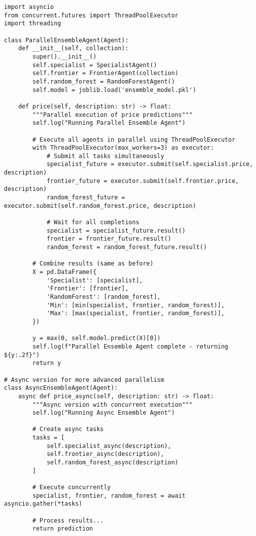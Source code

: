 \begin{lstlisting}[caption=Parallel Agent Execution (Enhanced Version)]
import asyncio
from concurrent.futures import ThreadPoolExecutor
import threading

class ParallelEnsembleAgent(Agent):
    def __init__(self, collection):
        super().__init__()
        self.specialist = SpecialistAgent()
        self.frontier = FrontierAgent(collection)
        self.random_forest = RandomForestAgent()
        self.model = joblib.load('ensemble_model.pkl')
        
    def price(self, description: str) -> float:
        """Parallel execution of price predictions"""
        self.log("Running Parallel Ensemble Agent")
        
        # Execute all agents in parallel using ThreadPoolExecutor
        with ThreadPoolExecutor(max_workers=3) as executor:
            # Submit all tasks simultaneously
            specialist_future = executor.submit(self.specialist.price, description)
            frontier_future = executor.submit(self.frontier.price, description)
            random_forest_future = executor.submit(self.random_forest.price, description)
            
            # Wait for all completions
            specialist = specialist_future.result()
            frontier = frontier_future.result()
            random_forest = random_forest_future.result()
        
        # Combine results (same as before)
        X = pd.DataFrame({
            'Specialist': [specialist],
            'Frontier': [frontier],
            'RandomForest': [random_forest],
            'Min': [min(specialist, frontier, random_forest)],
            'Max': [max(specialist, frontier, random_forest)],
        })
        
        y = max(0, self.model.predict(X)[0])
        self.log(f"Parallel Ensemble Agent complete - returning ${y:.2f}")
        return y

# Async version for more advanced parallelism
class AsyncEnsembleAgent(Agent):
    async def price_async(self, description: str) -> float:
        """Async version with concurrent execution"""
        self.log("Running Async Ensemble Agent")
        
        # Create async tasks
        tasks = [
            self.specialist_async(description),
            self.frontier_async(description), 
            self.random_forest_async(description)
        ]
        
        # Execute concurrently
        specialist, frontier, random_forest = await asyncio.gather(*tasks)
        
        # Process results...
        return prediction
\end{lstlisting}

